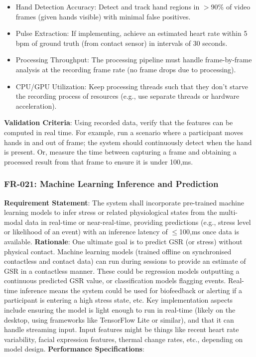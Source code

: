 \documentclass[11pt,a4paper]{report}
\begin{document}
\begin{itemize}
\item Hand Detection Accuracy: Detect and track hand regions in $>$90\% of video frames (given hands visible) with minimal false positives.
\item Pulse Extraction: If implementing, achieve an estimated heart rate within 5 bpm of ground truth (from contact sensor) in intervals of 30 seconds.
\item Processing Throughput: The processing pipeline must handle frame-by-frame analysis at the recording frame rate (no frame drops due to processing).
\item CPU/GPU Utilization: Keep processing threads such that they don't starve the recording process of resources (e.g., use separate threads or hardware acceleration).
\end{itemize} \textbf{Validation Criteria}: Using recorded data, verify that the features can be computed in real time. For example, run a scenario where a participant moves hands in and out of frame; the system should continuously detect when the hand is present. Or, measure the time between capturing a frame and obtaining a processed result from that frame to ensure it is under 100,ms. \subsubsection*{FR-021: Machine Learning Inference and Prediction}
\textbf{Requirement Statement}: The system shall incorporate pre-trained machine learning models to infer stress or related physiological states from the multi-modal data in real-time or near-real-time, providing predictions (e.g., stress level or likelihood of an event) with an inference latency of $\leq$100,ms once data is available. \textbf{Rationale}: One ultimate goal is to predict GSR (or stress) without physical contact. Machine learning models (trained offline on synchronised contactless and contact data) can run during sessions to provide an estimate of GSR in a contactless manner. These could be regression models outputting a continuous predicted GSR value, or classification models flagging events. Real-time inference means the system could be used for biofeedback or alerting if a participant is entering a high stress state, etc. Key implementation aspects include ensuring the model is light enough to run in real-time (likely on the desktop, using frameworks like TensorFlow Lite or similar), and that it can handle streaming input. Input features might be things like recent heart rate variability, facial expression features, thermal change rates, etc., depending on model design. \textbf{Performance Specifications}:
\end{document}
